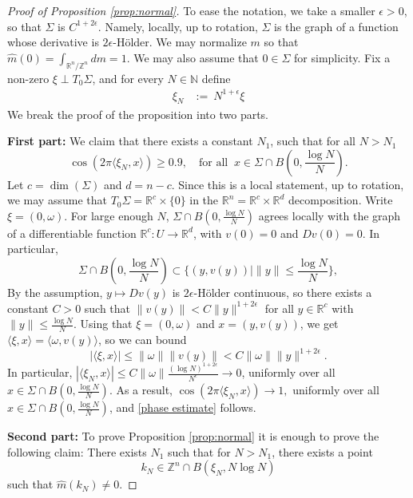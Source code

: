 \documentclass[11pt,letterpaper]{amsart}
\theoremstyle{definition}
\theoremstyle{plain}
\newcommand{\R}{{\mathbb R}}
\newcommand{\N}{{\mathbb N}}
\newcommand{\Z}{{\mathbb Z}}
\begin{document}
\begin{proof}[Proof of Proposition \ref{prop:normal}] To ease the notation, we take a smaller $\epsilon>0$, so that $\Sigma$ is $C^{1+2\epsilon}$. Namely, locally, up to rotation, $\Sigma$ is the graph of a function whose derivative is $2\epsilon$-Hölder.
We may normalize $m$ so that $\widehat{m}(0)=\int_{\R^n/\Z^n}dm=1$. We may also assume that $0\in\Sigma$ for simplicity. Fix a non-zero $\xi\perp T_{0}\Sigma$, and for every $N\in \N$ define
\begin{align}
    \xi_{N} & := \ N^{1+\epsilon}\xi
\end{align}
We break the proof of the proposition into two parts. 


\textbf{First part:} We claim that there exists a constant $N_{1}$, such that for all $N>N_1$
    \begin{equation}\label{phase estimate}
        \cos(2\pi \langle\xi_{N},x\rangle )\ge 0.9, \quad\text{for all }\  x\in\Sigma\cap B(0,\frac{\log N}{N}).
    \end{equation}
    Let $c=\dim(\Sigma)$ and $d=n-c$.
Since this is a local statement, up to rotation, we may assume that $T_{0}\Sigma=\R^{c}\times\{0\}$ in the $\R^n=\R^{c}\times\R^d$ decomposition. Write $\xi=(0,\omega)$. For large enough $N$, $\Sigma\cap B(0,\frac{\log N}{N})$ {agrees locally with} the graph of a differentiable function $\R^c\colon U\to\R^d$, with $v(0)=0$ and $Dv(0)=0$. In particular, \[\Sigma\cap B(0,\frac{\log N}{N})\subset\{(y,v(y))\mid \|y\|\le \frac{\log N}{N} \},\]
By the assumption, $y\mapsto Dv(y)$ is $2\epsilon$-Hölder continuous, so there exists a constant $C>0$ such that $\|v(y)\|<C \|y\|^{1+2\epsilon}$ for all $y\in\R^c$ {with $\|y\|\le \frac{\log N}{N}$}. Using that $\xi=(0,\omega)$ and $x=(y,v(y))$, we get $\langle\xi,x\rangle=\langle\omega,v(y)\rangle$, so we can bound $$|\langle\xi,x\rangle|\le\|\omega\|\|v(y)\|< C\|\omega\|\|y\|^{1+2\epsilon}. $$  
    In particular,      $\left|\langle\xi_{N},x\rangle \right|\le C\|\omega\|\frac{(\log N)^{1+2\epsilon}}{N^{\epsilon}} \to 0$,
    uniformly over all $x\in \Sigma\cap B(0,\frac{\log N}{N})$. As a result, $\cos(2\pi \langle\xi_{N},x\rangle)\to 1,$
    uniformly over all $x\in \Sigma\cap B(0,\frac{\log N}{N})$, and \eqref{phase estimate} follows.

    \textbf{Second part:} To prove Proposition \ref{prop:normal} it is enough to prove the following claim:
    There exists $N_{1}$ such that for $N>N_{1}$, there exists a point $$k_{N}\in \Z^n\cap B(\xi_{N},N\log N)$$ such that  $\widehat{m}(k_{N})\ne 0$. 
    

\end{proof}
\end{document}
